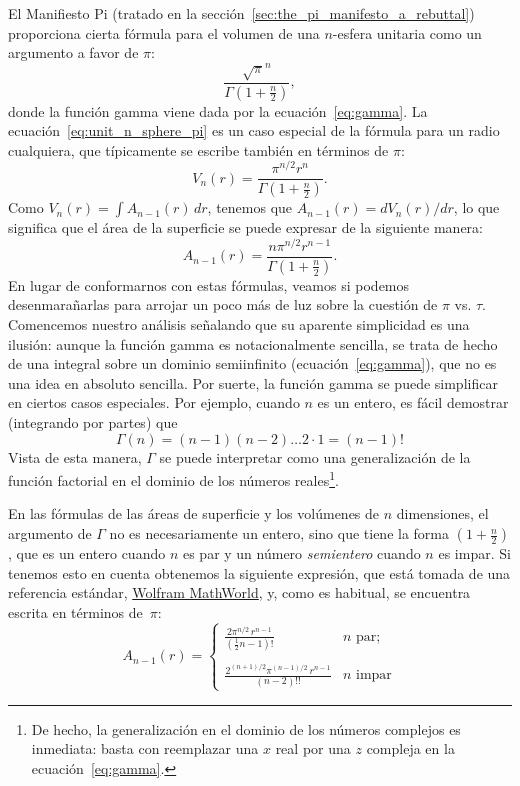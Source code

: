 El Manifiesto Pi (tratado en la sección~\ref{sec:the_pi_manifesto_a_rebuttal}) proporciona cierta fórmula para el volumen de una $n$-esfera unitaria como un argumento a favor de $\pi$:
\begin{equation}
\label{eq:unit_n_sphere_pi}
\frac{\sqrt{\pi}^{n} }{\Gamma(1 + \frac{n}{2})},
\end{equation}
donde la función gamma viene dada por la ecuación~\eqref{eq:gamma}. La ecuación~\eqref{eq:unit_n_sphere_pi} es un caso especial de la fórmula para un radio cualquiera, que típicamente se escribe también en términos de $\pi$:
\begin{equation}
\label{eq:n_sphere_pi}
V_n(r) = \frac{\pi^{n/2} r^n}{\Gamma(1 + \frac{n}{2})}.
\end{equation}
Como $V_n(r) = \int A_{n-1}(r)\,dr$, tenemos que $A_{n-1}(r) = dV_n(r)/dr$, lo que significa que el área de la superficie se puede expresar de la siguiente manera:
\begin{equation}
\label{eq:n_sphere_pi_r}
A_{n-1}(r) = \frac{n \pi^{n/2} r^{n-1}}{\Gamma(1 + \frac{n}{2})}.
\end{equation}
En lugar de conformarnos con estas fórmulas, veamos si podemos desenmarañarlas para arrojar un poco más de luz sobre la cuestión de $\pi$ vs. $\tau$. Comencemos nuestro análisis señalando que su aparente simplicidad es una ilusión: aunque la función gamma es notacionalmente sencilla, se trata de hecho de una integral sobre un dominio semiinfinito (ecuación~\eqref{eq:gamma}), que no es una idea en absoluto sencilla. Por suerte, la función gamma se puede simplificar en ciertos casos especiales. Por ejemplo, cuando $n$ es un entero, es fácil demostrar (integrando por partes) que
\[
\Gamma(n) = (n-1)(n-2)\ldots 2\cdot 1 = (n-1)!
\]
Vista de esta manera, $\Gamma$ se puede interpretar como una generalización de la función factorial en el dominio de los números reales\footnote{De hecho, la generalización en el dominio de los números complejos es inmediata: basta con reemplazar una $x$ real por una $z$ compleja en la ecuación~\eqref{eq:gamma}.}.

En las fórmulas de las áreas de superficie y los volúmenes de $n$ dimensiones, el argumento de $\Gamma$ no es necesariamente un entero, sino que tiene la forma $\left(1 + \frac{n}{2}\right)$, que es un entero cuando $n$ es par y un número \emph{semientero} cuando $n$ es impar. Si tenemos esto en cuenta obtenemos la siguiente expresión, que está tomada de una referencia estándar, \href{http://mathworld.wolfram.com/Hypersphere.html}{Wolfram MathWorld}, y, como es habitual, se encuentra escrita en términos de~$\pi$:
\begin{equation}
\label{eq:surface_area_mathworld}
A_{n-1}(r) = \begin{cases}
\displaystyle \frac{2\pi^{n/2}\,r^{n-1}}{(\frac{1}{2}n - 1)!} & n \text{ par}; \\ \\
 \displaystyle \frac{2^{(n+1)/2}\pi^{(n-1)/2}\,r^{n-1}}{(n-2)!!} & n \text{ impar}
\end{cases}
\end{equation}

